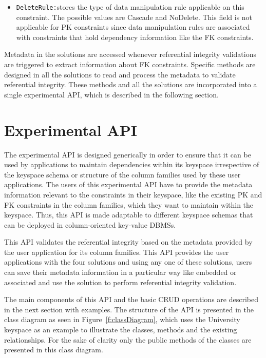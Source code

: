 \begin{itemize}
  \item \texttt{DeleteRule:}stores the type of data manipulation rule applicable
  on this constraint. The possible values are  Cascade and NoDelete. This
  field is not applicable  for \ac{PK} constraints since data manipulation
  rules are associated with constraints that hold dependency information like
  the \ac{FK} constraints.
  
\end{itemize}

Metadata in the solutions are accessed whenever referential integrity
validations are triggered to extract information about \ac{FK} constraints. 
Specific methods are designed in all the solutions to read and process the
metadata to validate referential integrity.  These methods and all the solutions
are incorporated into a single experimental \ac{API}, which is described in the
following section.

\section{Experimental API}\label{s:API}

The experimental \ac{API} is designed generically in order to ensure
that it can be used by  applications to maintain dependencies within its
keyspace irrespective of the keyspace schema or structure of the column
families used by these user applications.
The users of this experimental \ac{API}  have to provide the metadata
information relevant to the constraints in their keyspace, like the existing
\ac{PK} and \ac{FK} constraints in the column families, which they want to
maintain within the keyspace. 
Thus,  this \ac{API}
is made adaptable to different keyspace schemas  that can be deployed in
column-oriented key-value \acp{DBMS}.  

This \ac{API} validates the referential integrity based on the metadata provided
by the user application for its column families.  This \ac{API} provides the
user applications with the four solutions and  using any one of these solutions,
users can save their metadata information in a particular way like embedded or associated and  use the
solution to perform referential integrity validation.  

The main components of this \ac{API} and the basic \ac{CRUD} operations are
described in the next section with examples. The structure of the \ac{API} is
presented in the class diagram as seen in Figure~\ref{f:classDiagram}, which
uses the University keyspace as an example to illustrate the classes,  methods and
the existing relationships. For the sake of clarity only the public methods of
the classes are presented in this class diagram.

